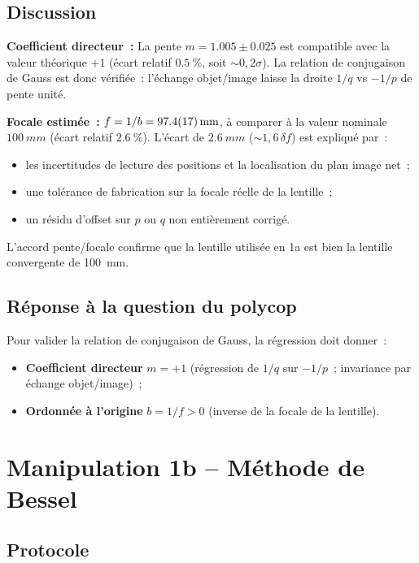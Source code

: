 ﻿\documentclass[a4paper, 11pt]{article}
\begin{document}
\subsection{Discussion}

\textbf{Coefficient directeur~:} La pente $m = \num{1.005} \pm \num{0.025}$ est compatible avec la valeur théorique $+1$ (écart relatif $\SI{0.5}{\percent}$, soit $\sim 0{,}2\sigma$). La relation de conjugaison de Gauss est donc vérifiée~: l'échange objet/image laisse la droite $1/q$ vs $-1/p$ de pente unité.

\textbf{Focale estimée~:} $f = 1/b = \SI{97.4 \pm 1.7}{mm}$, à comparer à la valeur nominale $\SI{100}{mm}$ (écart relatif $\SI{2.6}{\percent}$). L'écart de $\SI{2.6}{mm}$ ($\sim 1{,}6\,\delta f$) est expliqué par~:
\begin{itemize}
  \item les incertitudes de lecture des positions et la localisation du plan image net~;
  \item une tolérance de fabrication sur la focale réelle de la lentille~;
  \item un résidu d'offset sur $p$ ou $q$ non entièrement corrigé.
\end{itemize}
L'accord pente/focale confirme que la lentille utilisée en 1a est bien la lentille convergente de \SI{100}{mm}.

\subsection{Réponse à la question du polycop}

Pour valider la relation de conjugaison de Gauss, la régression doit donner~:
\begin{itemize}
  \item \textbf{Coefficient directeur} $m = +1$ (régression de $1/q$ sur $-1/p$~; invariance par échange objet/image)~;
  \item \textbf{Ordonnée à l'origine} $b = 1/f > 0$ (inverse de la focale de la lentille).
\end{itemize}

\section{Manipulation 1b – Méthode de Bessel}

\subsection{Protocole}
\end{document}
